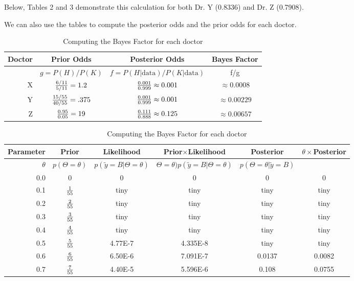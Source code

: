 \documentclass{article}
\begin{document}
Below, Tables 2 and 3 demonstrate this calculation for both Dr. Y (0.8336) and Dr. Z (0.7908).

We can also use the tables to compute the posterior odds and the prior odds for each doctor.
\begin{table}
\begin{flushleft}
  \begin{tabular}{| r | c | c | c|}
\hline
 \textbf{Doctor} & \textbf{Prior Odds} & \textbf{Posterior Odds} & \textbf{Bayes Factor} \\ \hline
					& \(g = P(H)/P(K)\)	&	\(f = P(H \vert \text{data})/P(K \vert \text{data})\)& f/g \\ \hline
		X 		& \({6/11 \over 5/11} = 1.2\) & \({0.001 \over 0.999} \approx 0.001\)  & \(\approx 0.0008\) \\
		Y 		& \({15/55 \over 40/55} = .375\) & \( {0.001 \over 0.999} \approx 0.001\)  & \(\approx 0.00229\) \\
		Z 		& \({0.95 \over 0.05} = 19\) & \( {0.111 \over 0.888} \approx 0.125\)  & \(\approx 0.00657\) \\
\hline
\end{tabular}
\end{flushleft}
\caption{Computing the Bayes Factor for each doctor}
\begin{flushleft}
  \begin{tabular}{| r | c | c | c | c | c |}
\hline
    \textbf{Parameter} & \textbf{Prior} & \textbf{Likelihood} & \textbf{Prior}\(\times\)\textbf{Likelihood} & \textbf{Posterior} & \(\theta \times\)Posterior \\ \hline
	\textbf{\(\theta\)} & \(p(\Theta=\theta)\) & \(p(\tilde{y} = B \vert \Theta=\theta)\) & \(\Theta=\theta)p(\tilde{y} = B \vert \Theta=\theta)\) & \(p( \Theta=\theta \vert \tilde{y} = B)\) & \\ \hline \hline
	0.0 & 0 & 0 & 0 & 0 & 0\\ \hline
	0.1 & \(1 \over 55\) & tiny & tiny & tiny & tiny \\ \hline
	0.2 & \(2 \over 55\) & tiny & tiny & tiny & tiny \\ \hline
	0.3 & \(3 \over 55\) & tiny & tiny & tiny & tiny  \\ \hline
	0.4 & \(4 \over 55\) & tiny & tiny & tiny & tiny \\ \hline
	0.5 & \(5 \over 55\) & 4.77E-7 & 4.335E-8 & tiny & tiny  \\ \hline
	0.6 & \(6 \over 55\) & 6.50E-6 & 7.091E-7 & 0.0137  & 0.0082 \\ \hline
	0.7 & \(7 \over 55\) & 4.40E-5 & 5.596E-6 & 0.108 & 0.0755 \\ \hline

\end{tabular}
\end{flushleft}
\end{table}
\end{document}

